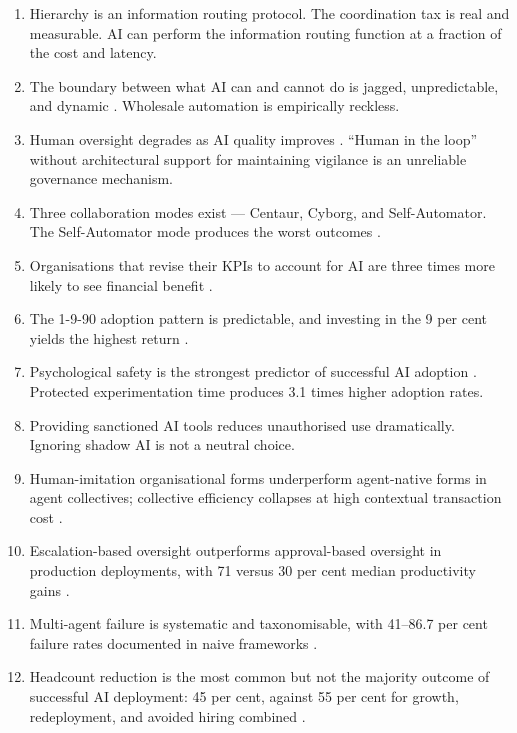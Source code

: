 \begin{enumerate}
  \item Hierarchy is an information routing protocol. The coordination tax is real and measurable. AI can perform the information routing function at a fraction of the cost and latency.
  \item The boundary between what AI can and cannot do is jagged, unpredictable, and dynamic \parencite{DellAcqua2026}. Wholesale automation is empirically reckless.
  \item Human oversight degrades as AI quality improves \parencite{DellAcqua2023}. ``Human in the loop'' without architectural support for maintaining vigilance is an unreliable governance mechanism.
  \item Three collaboration modes exist --- Centaur, Cyborg, and Self-Automator. The Self-Automator mode produces the worst outcomes \parencite{Randazzo2024}.
  \item Organisations that revise their KPIs to account for AI are three times more likely to see financial benefit \parencite{BCGAIKPIs2025}.
  \item The 1-9-90 adoption pattern is predictable, and investing in the 9 per cent yields the highest return \parencite{BCGAgenticShift2025}.
  \item Psychological safety is the strongest predictor of successful AI adoption \parencite{EdmondsonLei2025, GoogleAristotle2025}. Protected experimentation time produces 3.1 times higher adoption rates.
  \item Providing sanctioned AI tools reduces unauthorised use dramatically. Ignoring shadow AI is not a neutral choice.
  \item Human-imitation organisational forms underperform agent-native forms in agent collectives; collective efficiency collapses at high contextual transaction cost \parencite{Liu2026}.
  \item Escalation-based oversight outperforms approval-based oversight in production deployments, with 71 versus 30 per cent median productivity gains \parencite{Pereira2026Playbook}.
  \item Multi-agent failure is systematic and taxonomisable, with 41--86.7 per cent failure rates documented in naive frameworks \parencite{Cemri2025}.
  \item Headcount reduction is the most common but not the majority outcome of successful AI deployment: 45 per cent, against 55 per cent for growth, redeployment, and avoided hiring combined \parencite{Pereira2026Playbook, RampRevelio2026}.
\end{enumerate}

